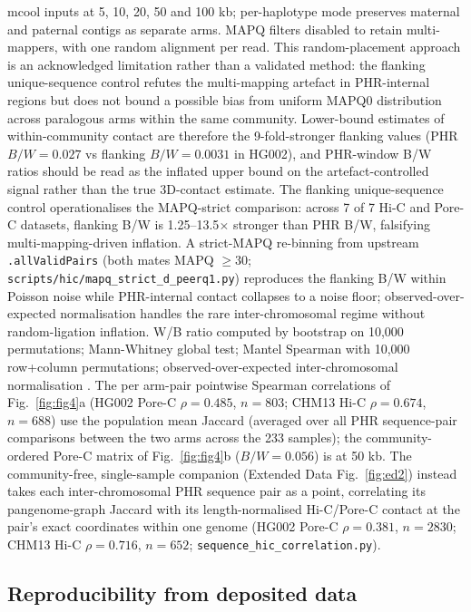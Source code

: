 \documentclass[pdflatex,mathphys]{jnl}
\begin{document}
mcool inputs at 5, 10, 20, 50 and 100 kb; per-haplotype mode preserves
maternal and paternal contigs as separate arms.
MAPQ filters disabled to retain multi-mappers, with one random alignment per
read.
This random-placement approach is an acknowledged limitation rather than a
validated method: the flanking unique-sequence control refutes the multi-mapping artefact in PHR-internal regions
but does not bound a possible bias from uniform MAPQ0 distribution across
paralogous arms within the same community.
Lower-bound estimates of within-community contact are therefore the 9-fold-stronger
flanking values (PHR $B/W = 0.027$ vs flanking $B/W = 0.0031$ in HG002), and
PHR-window B/W ratios should be read as the inflated upper bound on the
artefact-controlled signal rather than the true 3D-contact estimate.
The flanking unique-sequence control operationalises the MAPQ-strict comparison:
across 7 of 7 Hi-C and Pore-C datasets, flanking B/W is 1.25--13.5$\times$
stronger than PHR B/W, falsifying multi-mapping-driven inflation.
A strict-MAPQ re-binning from upstream \texttt{.allValidPairs} (both mates
MAPQ $\geq 30$; \texttt{scripts/hic/mapq\_strict\_d\_peerq1.py}) reproduces the
flanking B/W within Poisson noise while PHR-internal contact collapses to a
noise floor; observed-over-expected normalisation handles the rare
inter-chromosomal regime without random-ligation inflation.
W/B ratio computed by bootstrap on 10,000 permutations; Mann-Whitney global
test; Mantel Spearman with 10,000 row+column permutations; observed-over-expected
inter-chromosomal normalisation
.
The per arm-pair pointwise Spearman correlations of Fig.~\ref{fig:fig4}a (HG002
Pore-C $\rho = 0.485$, $n = 803$; CHM13 Hi-C $\rho = 0.674$, $n = 688$) use the
population mean Jaccard (averaged over all PHR sequence-pair comparisons between
the two arms across the 233 samples); the community-ordered Pore-C matrix of
Fig.~\ref{fig:fig4}b ($B/W = 0.056$) is at 50 kb.
The community-free, single-sample companion (Extended Data Fig.~\ref{fig:ed2})
instead takes each inter-chromosomal PHR sequence pair as a point, correlating
its pangenome-graph Jaccard with its length-normalised Hi-C/Pore-C contact at
the pair's exact coordinates within one genome (HG002 Pore-C $\rho = 0.381$,
$n = 2830$; CHM13 Hi-C $\rho = 0.716$, $n = 652$; \texttt{sequence\_hic\_correlation.py}).

\subsection*{Reproducibility from deposited data}
\end{document}

